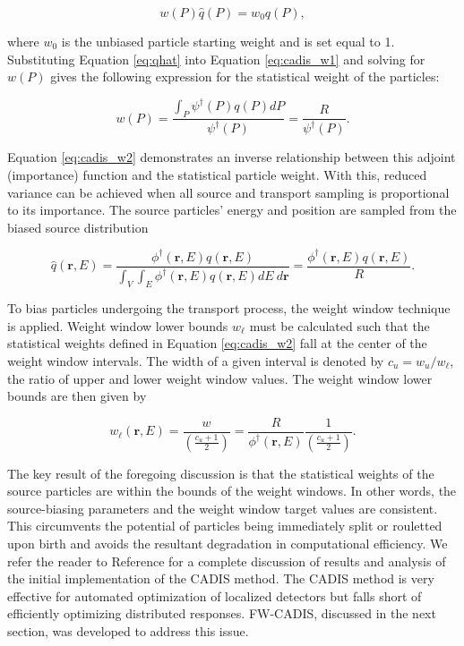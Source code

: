 \documentclass{article} %
\newcommand{\vecr}{\textbf{r}}
\newcommand{\qhat}{\ensuremath{\hat{q}}}
\newcommand{\fwc}{\mbox{FW-CADIS}}
\begin{document}
\begin{equation}
w(P)\qhat(P) = w_0q(P),
\label{eq:cadis_w1}
\end{equation}

\noindent where $w_0$ is the unbiased particle starting weight and is set equal
to 1. Substituting Equation \ref{eq:qhat} into Equation \ref{eq:cadis_w1} and
solving for $w(P)$ gives the following expression for the statistical weight of
the particles:

\begin{equation}
w(P) = \frac{\int_P\psi^{\dagger}(P)q(P)dP}{\psi^{\dagger}(P)}
= \frac{R}{\psi^{\dagger}(P)}.
\label{eq:cadis_w2}
\end{equation}

\noindent Equation \ref{eq:cadis_w2} demonstrates an inverse relationship
between this adjoint (importance) function and the statistical particle weight.
With this, reduced variance can be achieved when all source and transport
sampling is proportional to its importance. The source particles' energy and
position are sampled from the biased source distribution

\begin{equation}
\qhat(\vecr,E) = 
\frac{\phi^{\dagger}(\vecr,E)q(\vecr,E)}
{\int_V\int_E\phi^{\dagger}(\vecr,E)q(\vecr,E) dE\ d\vecr} 
= \frac{\phi^{\dagger}(\vecr,E)q(\vecr,E)}{R}.
\label{eq:cadis_sb}
\end{equation}

To bias particles undergoing the transport process, the weight window technique
is applied. Weight window lower bounds $w_{\ell}$ must be calculated such that
the statistical weights defined in Equation \ref{eq:cadis_w2} fall at the
center of the weight window intervals. The width of a given interval is denoted
by $c_u = w_u/w_{\ell}$, the ratio of upper and lower weight window values. The
weight window lower bounds are then given by

\begin{equation}
w_{\ell}(\vecr,E) = \frac{w}{\left(\frac{c_u +1}{2}\right)} 
= \frac{R}{\phi^{\dagger}(\vecr,E)}\frac{1}{\left(\frac{c_u +1}{2}\right)}.
\label{eq:cadis_tb}
\end{equation}

The key result of the foregoing discussion is that the statistical weights of
the source particles are within the bounds of the weight windows. In other
words, the source-biasing parameters and the weight window target values are
consistent. This circumvents the potential of particles being immediately split
or rouletted upon birth and avoids the resultant degradation in computational
efficiency. We refer the reader to Reference \cite{cadis} for a complete
discussion of results and analysis of the initial implementation of the CADIS
method. The CADIS method is very effective for automated optimization of
localized detectors but falls short of efficiently optimizing distributed
responses. \fwc, discussed in the next section, was developed to address this
issue.
\end{document}
